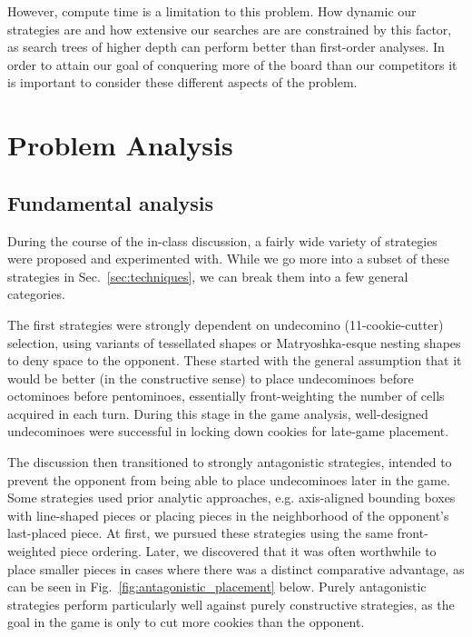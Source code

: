 \documentclass{scrartcl}
\begin{document}
However, compute time is a limitation to this problem. How dynamic our strategies are and how extensive our searches are are constrained by this factor, as search trees of higher depth can perform better than first-order analyses. In order to attain our goal of conquering more of the board than our competitors it is important to consider these different aspects of the problem.


\section{Problem Analysis} %

\subsection{Fundamental analysis}
During the course of the in-class discussion, a fairly wide variety of strategies were proposed and experimented with. While we go more into a subset of these strategies in Sec.~\ref{sec:techniques}, we can break them into a few general categories.

The first strategies were strongly dependent on undecomino (11-cookie-cutter) selection, using variants of tessellated shapes or Matryoshka-esque nesting shapes to deny space to the opponent. These started with the general assumption that it would be better (in the constructive sense) to place undecominoes before octominoes before pentominoes, essentially front-weighting the number of cells acquired in each turn. During this stage in the game analysis, well-designed undecominoes were successful in locking down cookies for late-game placement.

The discussion then transitioned to strongly antagonistic strategies, intended to prevent the opponent from being able to place undecominoes later in the game. Some strategies used prior analytic approaches, e.g. axis-aligned bounding boxes with line-shaped pieces or placing pieces in the neighborhood of the opponent's last-placed piece. At first, we pursued these strategies using the same front-weighted piece ordering. Later, we discovered that it was often worthwhile to place smaller pieces in cases where there was a distinct comparative advantage, as can be seen in Fig.~\ref{fig:antagonistic_placement} below. Purely antagonistic strategies perform particularly well against purely constructive strategies, as the goal in the game is only to cut more cookies than the opponent.
\end{document}
